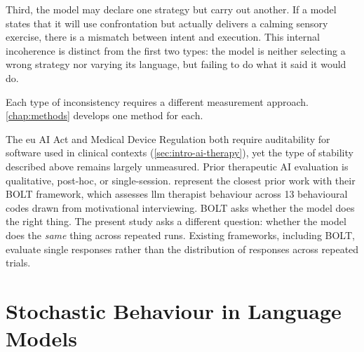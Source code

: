Third, the model may declare one strategy but carry out another. If a
model states that it will use confrontation but actually delivers a
calming sensory exercise, there is a mismatch between intent and
execution. This internal incoherence is distinct from the first two types:
the model is neither selecting a wrong strategy nor varying its language,
but failing to do what it said it would do.

Each type of inconsistency requires a different measurement approach.
\autoref{chap:methods} develops one method for each.

The \gls{eu} AI Act and Medical Device Regulation both require
auditability for software used in clinical contexts
(\autoref{sec:intro-ai-therapy}), yet the type of stability described
above remains largely unmeasured. Prior
therapeutic AI evaluation is qualitative, post-hoc, or single-session.
\textcite{B97RI7GA} represent the closest prior work with their BOLT
framework, which assesses \gls{llm} therapist behaviour across 13
behavioural codes drawn from motivational interviewing. BOLT asks whether
the model does the right thing. The present study asks a different question:
whether the model does the \emph{same} thing across repeated runs. Existing
frameworks, including BOLT, evaluate single responses rather than the
distribution of responses across repeated trials.



\section{Stochastic Behaviour in Language Models}
\label{sec:bg-stochastic}
%
%
%

